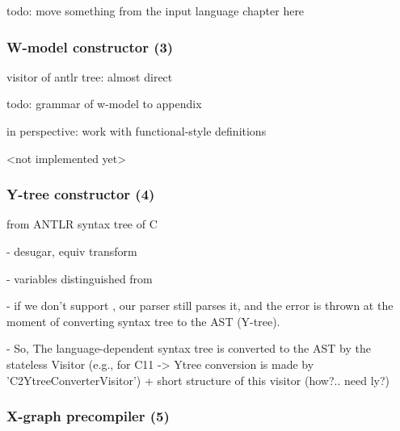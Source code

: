 
todo: move something from the input language chapter here


\subsubsection{W-model constructor (3)}
\label{ch:impl:proc:w-constr}

visitor of antlr tree: almost direct

todo: grammar of w-model to appendix

in perspective: work with functional-style definitions

<not implemented yet>


\subsubsection{Y-tree constructor (4)}
\label{ch:impl:proc:y-constr}

from ANTLR syntax tree of C

- desugar, equiv transform

- variables distinguished from 

- if we don't support , our parser still parses it, and the error is thrown at the moment of converting syntax tree to the AST (Y-tree).

- So, The language-dependent syntax tree is converted to the AST by the stateless Visitor (e.g., for C11 -> Ytree conversion is made by 'C2YtreeConverterVisitor') + short structure of this visitor (how?.. need ly?)


\subsubsection{X-graph precompiler (5)}
\label{ch:impl:proc:x-pre-compiler}




